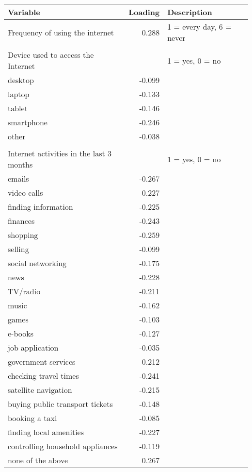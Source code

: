 \documentclass[12pt]{article}
\begin{document}
    \begin{tabular}{lrl}
        \toprule
        Variable & Loading & Description \\
        \midrule
        Frequency of using the internet & 0.288 & 1 = every day, 6 = never \\
        & & \\
        Device used to access the Internet & & 1 = yes, 0 = no \\
        desktop & -0.099 &  \\
        laptop & -0.133 & \\
        tablet & -0.146 & \\
        smartphone & -0.246 & \\
        other & -0.038 & \\
        & & \\
        Internet activities in the last 3 months & & 1 = yes, 0 = no \\
        emails & -0.267 & \\
        video calls & -0.227 & \\
        finding information & -0.225 & \\
        finances & -0.243 & \\
        shopping & -0.259 & \\
        selling & -0.099 & \\
        social networking & -0.175 & \\
        news & -0.228 & \\
        TV/radio & -0.211 & \\
        music & -0.162 & \\
        games & -0.103 & \\
        e-books & -0.127 & \\
        job application & -0.035 & \\
        government services & -0.212 & \\
        checking travel times & -0.241 & \\
        satellite navigation & -0.215 & \\
        buying public transport tickets & -0.148 & \\
        booking a taxi & -0.085 & \\
        finding local amenities & -0.227 & \\
        controlling household appliances & -0.119 & \\
        none of the above & 0.267 & \\
        \bottomrule
    \end{tabular}
\end{document}
